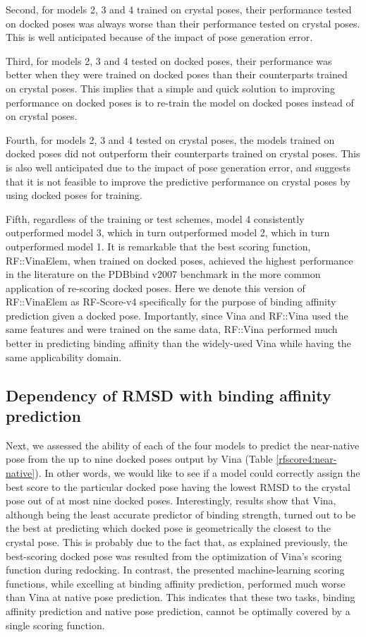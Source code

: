 \documentclass[twocolumn]{bmcart}
\begin{document}
Second, for models 2, 3 and 4 trained on crystal poses, their performance tested on docked poses was always worse than their performance tested on crystal poses. This is well anticipated because of the impact of pose generation error.

Third, for models 2, 3 and 4 tested on docked poses, their performance was better when they were trained on docked poses than their counterparts trained on crystal poses. This implies that a simple and quick solution to improving performance on docked poses is to re-train the model on docked poses instead of on crystal poses.

Fourth, for models 2, 3 and 4 tested on crystal poses, the models trained on docked poses did not outperform their counterparts trained on crystal poses. This is also well anticipated due to the impact of pose generation error, and suggests that it is not feasible to improve the predictive performance on crystal poses by using docked poses for training.

Fifth, regardless of the training or test schemes, model 4 consistently outperformed model 3, which in turn outperformed model 2, which in turn outperformed model 1. It is remarkable that the best scoring function, RF::VinaElem, when trained on docked poses, achieved the highest performance in the literature on the PDBbind v2007 benchmark in the more common application of re-scoring docked poses. Here we denote this version of RF::VinaElem as RF-Score-v4 specifically for the purpose of binding affinity prediction given a docked pose. Importantly, since Vina and RF::Vina used the same features and were trained on the same data, RF::Vina performed much better in predicting binding affinity than the widely-used Vina while having the same applicability domain.

\subsection*{Dependency of RMSD with binding affinity prediction}

Next, we assessed the ability of each of the four models to predict the near-native pose from the up to nine docked poses output by Vina (Table \ref{rfscore4:near-native}). In other words, we would like to see if a model could correctly assign the best score to the particular docked pose having the lowest RMSD to the crystal pose out of at most nine docked poses. Interestingly, results show that Vina, although being the least accurate predictor of binding strength, turned out to be the best at predicting which docked pose is geometrically the closest to the crystal pose. This is probably due to the fact that, as explained previously, the best-scoring docked pose was resulted from the optimization of Vina's scoring function during redocking. In contrast, the presented machine-learning scoring functions, while excelling at binding affinity prediction, performed much worse than Vina at native pose prediction. This indicates that these two tasks, binding affinity prediction and native pose prediction, cannot be optimally covered by a single scoring function.
\end{document}
